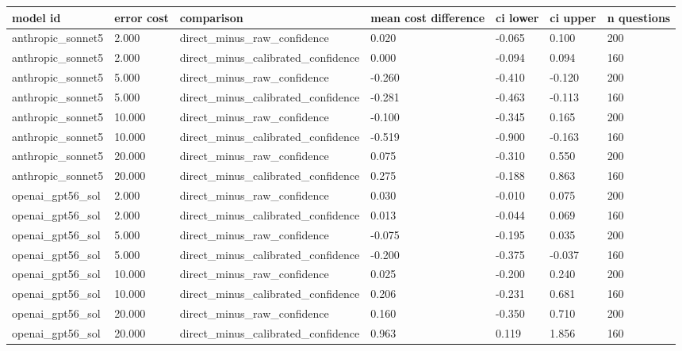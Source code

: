 \begin{tabular}{lllllll}
\toprule
model id & error cost & comparison & mean cost difference & ci lower & ci upper & n questions \\
\midrule
anthropic\_sonnet5 & 2.000 & direct\_minus\_raw\_confidence & 0.020 & -0.065 & 0.100 & 200 \\
anthropic\_sonnet5 & 2.000 & direct\_minus\_calibrated\_confidence & 0.000 & -0.094 & 0.094 & 160 \\
anthropic\_sonnet5 & 5.000 & direct\_minus\_raw\_confidence & -0.260 & -0.410 & -0.120 & 200 \\
anthropic\_sonnet5 & 5.000 & direct\_minus\_calibrated\_confidence & -0.281 & -0.463 & -0.113 & 160 \\
anthropic\_sonnet5 & 10.000 & direct\_minus\_raw\_confidence & -0.100 & -0.345 & 0.165 & 200 \\
anthropic\_sonnet5 & 10.000 & direct\_minus\_calibrated\_confidence & -0.519 & -0.900 & -0.163 & 160 \\
anthropic\_sonnet5 & 20.000 & direct\_minus\_raw\_confidence & 0.075 & -0.310 & 0.550 & 200 \\
anthropic\_sonnet5 & 20.000 & direct\_minus\_calibrated\_confidence & 0.275 & -0.188 & 0.863 & 160 \\
openai\_gpt56\_sol & 2.000 & direct\_minus\_raw\_confidence & 0.030 & -0.010 & 0.075 & 200 \\
openai\_gpt56\_sol & 2.000 & direct\_minus\_calibrated\_confidence & 0.013 & -0.044 & 0.069 & 160 \\
openai\_gpt56\_sol & 5.000 & direct\_minus\_raw\_confidence & -0.075 & -0.195 & 0.035 & 200 \\
openai\_gpt56\_sol & 5.000 & direct\_minus\_calibrated\_confidence & -0.200 & -0.375 & -0.037 & 160 \\
openai\_gpt56\_sol & 10.000 & direct\_minus\_raw\_confidence & 0.025 & -0.200 & 0.240 & 200 \\
openai\_gpt56\_sol & 10.000 & direct\_minus\_calibrated\_confidence & 0.206 & -0.231 & 0.681 & 160 \\
openai\_gpt56\_sol & 20.000 & direct\_minus\_raw\_confidence & 0.160 & -0.350 & 0.710 & 200 \\
openai\_gpt56\_sol & 20.000 & direct\_minus\_calibrated\_confidence & 0.963 & 0.119 & 1.856 & 160 \\
\bottomrule
\end{tabular}
